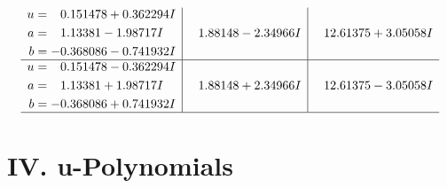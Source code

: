 \documentclass[1p]{elsarticle_modified}
\theoremstyle{definition}
\begin{document}
$$\begin{array}{c|c|c}
\begin{aligned}
u &= \phantom{-}0.151478 + 0.362294 I \\
a &= \phantom{-}1.13381 - 1.98717 I \\
b &= -0.368086 - 0.741932 I\end{aligned}
 & \phantom{-}1.88148 - 2.34966 I & \phantom{-}12.61375 + 3.05058 I \\ \hline\begin{aligned}
u &= \phantom{-}0.151478 - 0.362294 I \\
a &= \phantom{-}1.13381 + 1.98717 I \\
b &= -0.368086 + 0.741932 I\end{aligned}
 & \phantom{-}1.88148 + 2.34966 I & \phantom{-}12.61375 - 3.05058 I\\
 \hline 
 \end{array}$$\newpage
\newpage\renewcommand{\arraystretch}{1}
\centering \section*{ IV. u-Polynomials}
\end{document}
